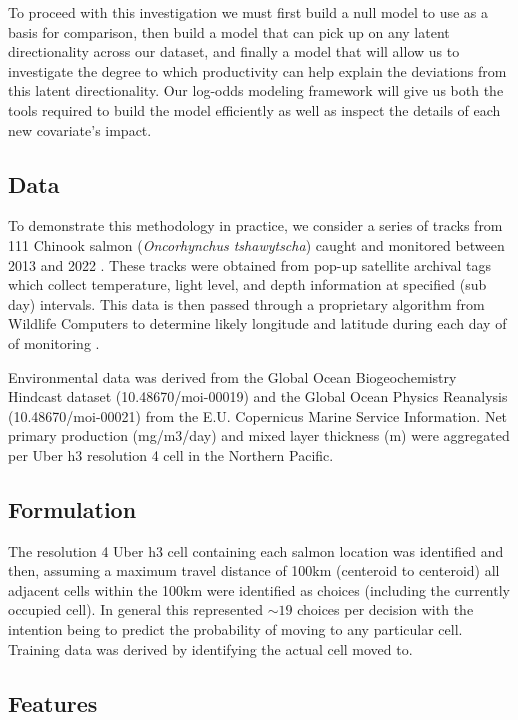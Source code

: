 \documentclass[11pt]{article}
\begin{document}
\FloatBarrier

To proceed with this investigation we must first build a null model to use as a basis for comparison, then build a model that can pick up on any latent directionality across our dataset, and finally a model that will allow us to investigate the degree to which productivity can help explain the deviations from this latent directionality. Our log-odds modeling framework will give us both the tools required to build the model efficiently as well as inspect the details of each new covariate's impact.


\subsection*{Data}

To demonstrate this methodology in practice, we consider a series of tracks from 111 Chinook salmon (\textit{Oncorhynchus tshawytscha}) caught and monitored between 2013 and 2022 \citep{tags1} \citep{tags2}. These tracks were obtained from pop-up satellite archival tags which collect temperature, light level, and depth information at specified (sub day) intervals. This data is then passed through a proprietary algorithm from Wildlife Computers to determine likely longitude and latitude during each day of of monitoring \citep{PSAT}. \newline

Environmental data was derived from the Global Ocean Biogeochemistry Hindcast dataset (10.48670/moi-00019) and the Global Ocean Physics Reanalysis (10.48670/moi-00021) from the E.U. Copernicus Marine Service Information. Net primary production (mg/m3/day) and mixed layer thickness (m) were aggregated per Uber h3 resolution 4 cell in the Northern Pacific. 

\subsection*{Formulation}

The resolution 4 Uber h3 cell containing each salmon location was identified and then, assuming a maximum travel distance of 100km (centeroid to centeroid) all adjacent cells within the 100km were identified as choices (including the currently occupied cell). In general this represented $\sim 19$ choices per decision with the intention being to predict the probability of moving to any particular cell. Training data was derived by identifying the actual cell moved to. 

\subsection*{Features} 
\end{document}
